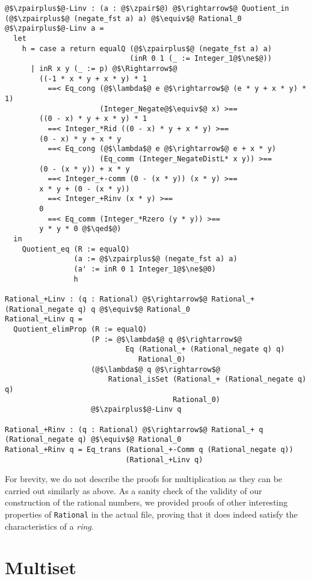 \documentclass[12pt,twoside,maitrise]{dms}
\theoremstyle{definition}
\numberwithin{equation}{section}
\numberwithin{table}{chapter}
\numberwithin{figure}{chapter}
\newcommand\id[1] {\texttt{#1}}
\renewcommand\qed{\blacksquare}
\begin{document}
\begin{verbatim}
@$\zpairplus$@-Linv : (a : @$\zpair$@) @$\rightarrow$@ Quotient_in (@$\zpairplus$@ (negate_fst a) a) @$\equiv$@ Rational_0
@$\zpairplus$@-Linv a =
  let
    h = case a return equalQ (@$\zpairplus$@ (negate_fst a) a)
                             (inR 0 1 (_ := Integer_1@$\ne$@))
      | inR x y (_ := p) @$\Rightarrow$@
        ((-1 * x * y + x * y) * 1
          ==< Eq_cong (@$\lambda$@ e @$\rightarrow$@ (e * y + x * y) * 1)
                      (Integer_Negate@$\equiv$@ x) >==
        ((0 - x) * y + x * y) * 1
          ==< Integer_*Rid ((0 - x) * y + x * y) >==
        (0 - x) * y + x * y
          ==< Eq_cong (@$\lambda$@ e @$\rightarrow$@ e + x * y)
                      (Eq_comm (Integer_NegateDistL* x y)) >==
        (0 - (x * y)) + x * y
          ==< Integer_+-comm (0 - (x * y)) (x * y) >==
        x * y + (0 - (x * y))
          ==< Integer_+Rinv (x * y) >==
        0
          ==< Eq_comm (Integer_*Rzero (y * y)) >==
        y * y * 0 @$\qed$@)
  in
    Quotient_eq (R := equalQ)
                (a := @$\zpairplus$@ (negate_fst a) a)
                (a' := inR 0 1 Integer_1@$\ne$@0)
                h

Rational_+Linv : (q : Rational) @$\rightarrow$@ Rational_+ (Rational_negate q) q @$\equiv$@ Rational_0
Rational_+Linv q =
  Quotient_elimProp (R := equalQ)
                    (P := @$\lambda$@ q @$\rightarrow$@
                            Eq (Rational_+ (Rational_negate q) q)
                               Rational_0)
                    (@$\lambda$@ q @$\rightarrow$@
                        Rational_isSet (Rational_+ (Rational_negate q) q)
                                       Rational_0)
                    @$\zpairplus$@-Linv q

Rational_+Rinv : (q : Rational) @$\rightarrow$@ Rational_+ q (Rational_negate q) @$\equiv$@ Rational_0
Rational_+Rinv q = Eq_trans (Rational_+-Comm q (Rational_negate q))
                            (Rational_+Linv q)

\end{verbatim}

For brevity, we do not describe the proofs for multiplication as they can be
carried out similarly as above. As a sanity check of the validity of
our construction of the rational numbers, we provided proofs of other
interesting properties of \id{Rational} in the actual file, proving that it does
indeed satisfy the characteristics of a \emph{ring}.

\section{Multiset}\label{sec:multiset}
\end{document}
